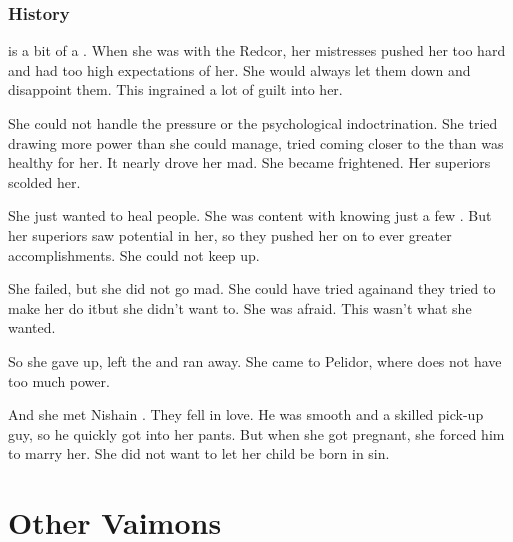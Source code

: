 \subsection{History}
\Roanne{} is a bit of a . 
When she was with the Redcor, her mistresses pushed her too hard and had too high expectations of her. 
She would always let them down and disappoint them. 
This ingrained a lot of guilt into her. 

She could not handle the pressure or the psychological indoctrination. 
She tried drawing more \iquin{} power than she could manage, tried coming closer to the \sephiroth{} than was healthy for her. 
It nearly drove her mad. 
She became frightened. 
Her superiors scolded her. 

She just wanted to heal people. 
She was content with knowing just a few \sephiroth. 
But her superiors saw potential in her, so they pushed her on to ever greater accomplishments. 
She could not keep up. 

She failed, but she did not go mad. 
She could have tried again\dash and they tried to make her do it\dash but she didn't want to.
She was afraid. 
This wasn't what she wanted. 

So she gave up, left the \vclan and ran away. 
She came to Pelidor, where \ClanRedcor does not have too much power. 

And she met Nishain \Shireyo. 
They fell in love. 
He was smooth and a skilled pick-up guy, so he quickly got into her pants. 
But when she got pregnant, she forced him to marry her. 
She did not want to let her child be born in sin. 












































\chapter{Other Vaimons}















